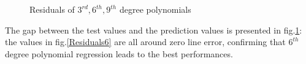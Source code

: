 \documentclass[10pt,a4paper]{article}
\begin{document}
	\begin{figure}[!h]
		\centering
		\qquad\qquad
		\qquad\qquad
		\qquad\qquad
		\caption{Residuals of $3^{rd},6^{th}, 9^{th}$ degree polynomials \label{Residuals__}}
	\end{figure}
	
	The gap between the test values and the prediction values is presented in fig.\ref{Residuals__}: the values in fig.\ref{Residuals6} are all around zero line error, confirming that $6^{th}$ degree polynomial regression leads to the best performances. 
	
\end{document}
